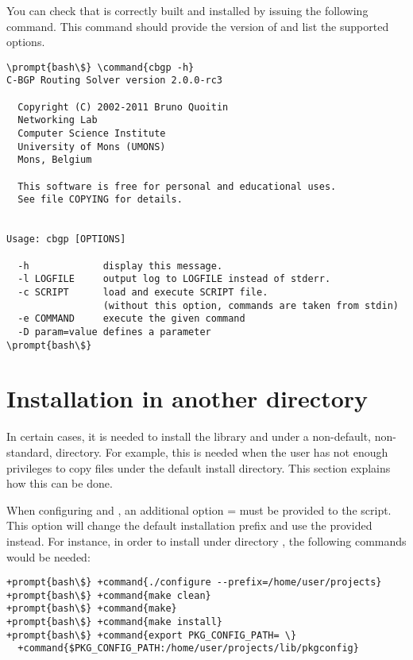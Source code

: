 You can check that  is correctly built and
installed by issuing the following command. This command should
provide the version of  and list the supported
options.

\begin{Verbatim}[commandchars=\\\{\}]
\prompt{bash\$} \command{cbgp -h}
C-BGP Routing Solver version 2.0.0-rc3

  Copyright (C) 2002-2011 Bruno Quoitin
  Networking Lab
  Computer Science Institute
  University of Mons (UMONS)
  Mons, Belgium
  
  This software is free for personal and educational uses.
  See file COPYING for details.


Usage: cbgp [OPTIONS]

  -h             display this message.
  -l LOGFILE     output log to LOGFILE instead of stderr.
  -c SCRIPT      load and execute SCRIPT file.
                 (without this option, commands are taken from stdin)
  -e COMMAND     execute the given command
  -D param=value defines a parameter
\prompt{bash\$}
\end{Verbatim}

\section{Installation in another directory}
\label{sec:inst-other-dir}

In certain cases, it is needed to install the 
library and  under a non-default, non-standard,
directory. For example, this is needed when the user has not enough
privileges to copy files under the default install directory. This
section explains how this can be done.

When configuring  and , an
additional option = must be
provided to the  script. This option will change
the default installation prefix and use the provided 
instead. For instance, in order to install under directory
, the following commands would be
needed:

\begin{Verbatim}[commandchars=+\{\}]
+prompt{bash\$} +command{./configure --prefix=/home/user/projects}
+prompt{bash\$} +command{make clean}
+prompt{bash\$} +command{make}
+prompt{bash\$} +command{make install}
+prompt{bash\$} +command{export PKG_CONFIG_PATH= \}
  +command{$PKG_CONFIG_PATH:/home/user/projects/lib/pkgconfig}
\end{Verbatim}

